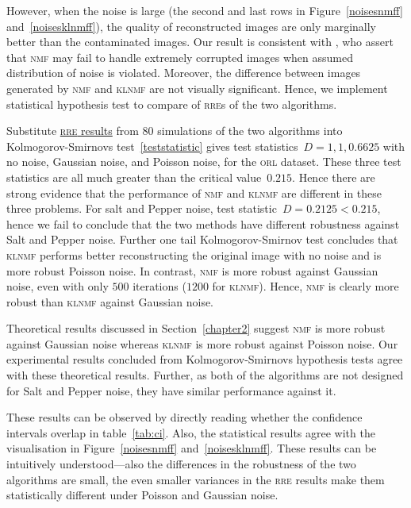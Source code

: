 However, when the noise is large (the second and last rows in Figure~\ref{noisesnmff} and~\ref{noisesklnmff}), the quality of reconstructed images are only marginally better than the contaminated images.
Our result is consistent with \citet{guan2017truncated}, who assert that \textsc{nmf} may fail to handle extremely corrupted images when assumed distribution of noise is violated.
Moreover, the difference between images generated by \textsc{nmf} and \textsc{klnmf} are not visually significant.
Hence, we implement statistical hypothesis test to compare of \textsc{rre}s of the two algorithms.

Substitute \href{https://raw.githubusercontent.com/JoyceXinyueWang/nmf_raw_data/master/raw_result_acc.csv}{\textsc{rre} results} from $80$ simulations of the two algorithms into Kolmogorov-Smirnovs test~\eqref{teststatistic} gives test statistics~$D=1, 1 ,0.6625$ with no noise, Gaussian noise, and Poisson noise, for the \textsc{orl} dataset. These three test statistics are all much greater than the critical value~$0.215$. Hence there are strong evidence that the performance of \textsc{nmf} and \textsc{klnmf} are different in these three problems. For salt and Pepper noise, test statistic~$D=0.2125<0.215$, hence we fail to conclude that the two methods have different robustness against Salt and Pepper noise. Further one tail Kolmogorov-Smirnov test concludes that \textsc{klnmf} performs better reconstructing the original image with no noise and is more robust Poisson noise.
In contrast, \textsc{nmf} is more robust against Gaussian noise, even with only $500$ iterations ($1200$ for \textsc{klnmf}). Hence, \textsc{nmf} is clearly more robust than \textsc{klnmf} against Gaussian noise.

Theoretical results discussed in Section~\ref{chapter2} suggest \textsc{nmf} is more robust against Gaussian noise whereas \textsc{klnmf} is more robust against Poisson noise. Our experimental results concluded from Kolmogorov-Smirnovs hypothesis tests agree with these theoretical results. Further, as both of the algorithms are not designed for Salt and Pepper noise, they have similar performance against it.

These results can be observed by directly reading whether the confidence intervals overlap in table~\ref{tab:ci}. Also, the statistical results agree with the visualisation in Figure~\ref{noisesnmff} and~\ref{noisesklnmff}. These results can be intuitively understood---also the differences in the robustness of the two algorithms are small, the even smaller variances in the \textsc{rre} results make them statistically different under Poisson and Gaussian noise.

